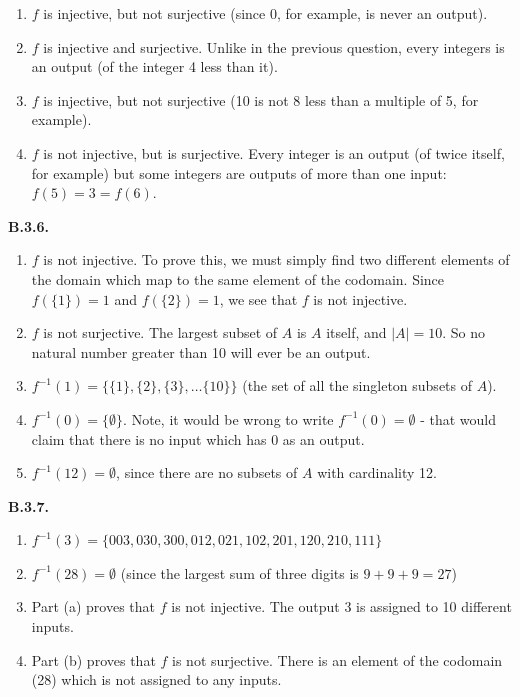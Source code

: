 \documentclass[10pt,]{book}
\theoremstyle{plain}
\theoremstyle{definition}
\theoremstyle{definition}
\theoremstyle{definition}
\theoremstyle{definition}
\numberwithin{equation}{chapter}
\def\inv{^{-1}}
\begin{document}
\begin{enumerate}[label=(\alph*)]
\item\hypertarget{li-577}{}\(f\) is injective, but not surjective (since 0, for example, is never an output).%
\item\hypertarget{li-578}{}\(f\) is injective and surjective. Unlike in the previous question, every integers is an output (of the integer 4 less than it).%
\item\hypertarget{li-579}{}\(f\) is injective, but not surjective (10 is not 8 less than a multiple of 5, for example).%
\item\hypertarget{li-580}{}\(f\) is not injective, but is surjective. Every integer is an output (of twice itself, for example) but some integers are outputs of more than one input: \(f(5) = 3 = f(6)\).%
\end{enumerate}
%
\par\smallskip
\noindent\textbf{B.3.6.} \hypertarget{p-1708}{}%
\leavevmode%
\begin{enumerate}[label=(\alph*)]
\item\hypertarget{li-586}{}\hypertarget{p-1709}{}%
\(f\) is not injective. To prove this, we must simply find two different elements of the domain which map to the same element of the codomain. Since \(f(\{1\}) = 1\) and \(f(\{2\}) = 1\), we see that \(f\) is not injective.%
\item\hypertarget{li-587}{}\hypertarget{p-1710}{}%
\(f\) is not surjective. The largest subset of \(A\) is \(A\) itself, and \(|A| = 10\). So no natural number greater than 10 will ever be an output.%
\item\hypertarget{li-588}{}\hypertarget{p-1711}{}%
\(f\inv(1) = \{\{1\}, \{2\}, \{3\}, \ldots \{10\}\}\) (the set of all the singleton subsets of \(A\)).%
\item\hypertarget{li-589}{}\hypertarget{p-1712}{}%
\(f\inv(0) = \{\emptyset\}\). Note, it would be wrong to write \(f\inv(0) = \emptyset\) - that would claim that there is no input which has 0 as an output.%
\item\hypertarget{li-590}{}\hypertarget{p-1713}{}%
\(f\inv(12) = \emptyset\), since there are no subsets of \(A\) with cardinality 12.%
\end{enumerate}
%
\par\smallskip
\noindent\textbf{B.3.7.} \hypertarget{p-1719}{}%
\leavevmode%
\begin{enumerate}[label=(\alph*)]
\item\hypertarget{li-595}{}\(f\inv(3) = \{003, 030, 300, 012, 021, 102, 201, 120, 210, 111\}\)%
\item\hypertarget{li-596}{}\(f\inv(28) = \emptyset\) (since the largest sum of three digits is \(9+9+9 = 27\))%
\item\hypertarget{li-597}{}\hypertarget{p-1720}{}%
Part (a) proves that \(f\) is not injective. The output 3 is assigned to 10 different inputs.%
\item\hypertarget{li-598}{}\hypertarget{p-1721}{}%
Part (b) proves that \(f\) is not surjective. There is an element of the codomain (28) which is not assigned to any inputs.%
\end{enumerate}
\end{document}
